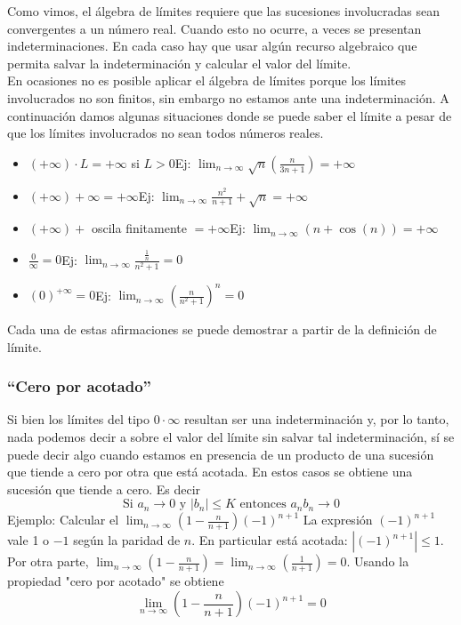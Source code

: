 \documentclass[../Teoría.root.tex]{subfiles}
\begin{document}
Como vimos, el álgebra de límites requiere que las sucesiones involucradas sean convergentes a un número real.
Cuando esto no ocurre, a veces se presentan indeterminaciones.
En cada caso hay que usar algún recurso algebraico que permita salvar la indeterminación y calcular el valor del límite.\\
En ocasiones no es posible aplicar el álgebra de límites porque los límites involucrados no son finitos, sin embargo no estamos ante una indeterminación.
A continuación damos algunas situaciones donde se puede saber el límite a pesar de que los límites involucrados no sean todos números reales.
\begin{itemize}
    \item \((+\infty)\cdot L=+\infty\) si \(L>0\)\tab Ej:
          \(\lim_{n\to\infty}\sqrt{n}\left(\frac{n}{3n+1}\right)=+\infty\)
    \item \((+\infty)+\infty=+\infty\)\tab Ej:
          \(\lim_{n\to\infty}\frac{n^2}{n+1}+\sqrt{n}=+\infty\)
    \item \((+\infty)+\) oscila finitamente \(=+\infty\)\tab Ej:
          \(\lim_{n\to\infty}(n+\cos(n))=+\infty\)
    \item \(\frac{0}{\infty}=0\)\tab Ej:
          \(\lim_{n\to\infty}\frac{\frac{1}{n}}{n^2+1}=0\)
    \item \((0)^{+\infty}=0\)\tab Ej:
          \(\lim_{n\to\infty}\left(\frac{n}{n^2+1}\right)^n=0\)
\end{itemize}
Cada una de estas afirmaciones se puede demostrar a partir de la definición de límite.
\subsubsection{``Cero por acotado''}
Si bien los límites del tipo \(0\cdot\infty\) resultan ser una indeterminación y, por lo tanto, nada podemos decir a sobre el valor del límite sin salvar tal indeterminación, sí se puede decir algo cuando estamos en presencia de un producto de una sucesión que tiende a cero por otra que está acotada.
En estos casos se obtiene una sucesión que tiende a cero.
Es decir \[\text{Si }a_n\rightarrow0\text{ y }|b_n|\leq K\text{ entonces }a_nb_n\rightarrow0\]
Ejemplo: Calcular el \(\lim_{n\to\infty}\left(1-\frac{n}{n+1}\right)(-1)^{n+1}\)
La expresión \((-1)^{n+1}\) vale 1 o \(-1\) según la paridad de \(n\).
En particular está acotada: \(|(-1)^{n+1}|\leq1\).
Por otra parte, \(\lim_{n\to\infty}\left(1-\frac{n}{n+1}\right)=\lim_{n\to\infty}\left(\frac{1}{n+1}\right)=0\).
Usando la propiedad "cero por acotado" se obtiene
\[\lim_{n\to\infty}\left(1-\frac{n}{n+1}\right)(-1)^{n+1}=0\]
\end{document}
